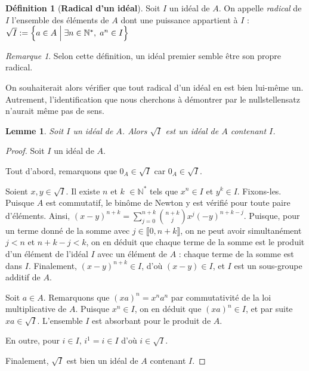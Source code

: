 \documentclass[10pt, twoside]{article}
\theoremstyle{plain}
\theoremstyle{definition}
\newtheorem{definition}[theorem]{Définition}
\theoremstyle{plain}
\theoremstyle{plain}
\newtheorem{lemma}[theorem]{Lemme}
\theoremstyle{definition}
\theoremstyle{remark}
\newtheorem*{remark}{Remarque}
\begin{document}
\begin{definition}[\textbf{Radical d'un idéal}]\label{def:rad}
    Soit $I$ un idéal de $A$. On appelle \textit{radical} de $I$ l'ensemble des éléments de $A$ dont une puissance appartient à $I$ : $\sqrt{I} := \Bigl\{a \in A \; \Big| \; \exists n \in \mathbb{N}^*, \; a^n \in I \Bigr\}$
\end{definition}

\begin{remark}
    Selon cette définition, un idéal premier semble être son propre radical. 
\end{remark}

On souhaiterait alors vérifier que tout radical d'un idéal en est bien lui-même un. Autrement, l'identification que nous cherchons à démontrer par le nullstellensatz n'aurait même pas de sens.

\begin{lemma}\label{lem:rad id}
    Soit $I$ un idéal de $A$. Alors $\sqrt{I}$ est un idéal de $A$ contenant $I$.
\end{lemma}

\begin{proof}
    Soit $I$ un idéal de $A$.
    
    Tout d'abord, remarquons que $0_A \in \sqrt{I}$ car $0_A \in \sqrt{I}$.

    Soient $x, y \in \sqrt{I}$. Il existe $n$ et $k$ $\in \mathbb{N}^*$ tels que $x^n \in I$ et $y^k \in I $. Fixons-les. 
    Puisque $A$ est commutatif, le binôme de Newton y est vérifié pour toute paire d'éléments. Ainsi, $(x-y)^{n+k}= \sum\limits_{j=0}^{n+k} \binom{n+k}{j}x^j(-y)^{n+k-j}$. Puisque, pour un terme donné de la somme avec $j \in \llbracket 0, n+k \rrbracket$, on ne peut avoir simultanément $j < n$ et $n+k-j < k$, on en déduit que chaque terme de la somme est le produit d'un élément de l'idéal $I$ avec un élément de $A$ : chaque terme de la somme est dans $I$. Finalement, $ (x-y)^{n+k} \in I$, d'où $(x - y) \in I$, et $I$ est un sous-groupe additif de $A$.

    Soit $a \in A$. Remarquons que $(xa)^n = x^n a^n$ par commutativité de la loi multiplicative de $A$. Puisque $x^n \in I$, on en déduit que $(xa)^n \in I$, et par suite $xa \in \sqrt{I}$. L'ensemble $I$ est absorbant pour le produit de $A$. 

    En outre, pour $i \in I$, $i^1 = i \in I$ d'où $i \in \sqrt{I}$.
    
    Finalement, $\sqrt{I}$ est bien un idéal de $A$ contenant $I$.
\end{proof}
\end{document}
